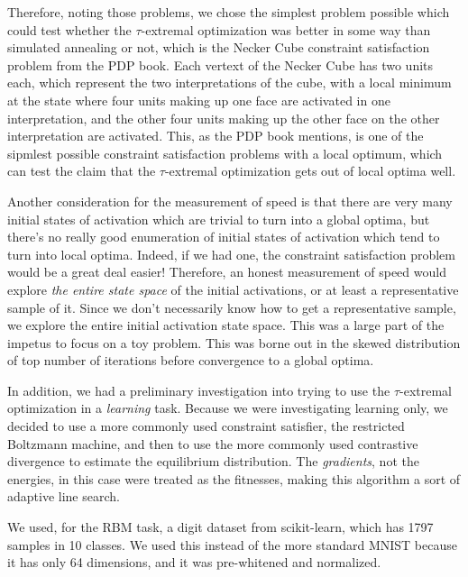 \documentclass[12pt]{article}
\begin{document}

Therefore, noting those problems, we chose the simplest problem possible which could test whether the $\tau$-extremal optimization was better in some way than simulated annealing or not, which is the Necker Cube constraint satisfaction problem from the PDP book. Each vertext of the Necker Cube has two units each, which represent the two interpretations of the cube, with a local minimum at the state where four units making up one face are activated in one interpretation, and the other four units making up the other face on the other interpretation are activated. This, as the PDP book mentions, is one of the sipmlest possible constraint satisfaction problems with a local optimum, which can test the claim that the $\tau$-extremal optimization gets out of local optima well.

Another consideration for the measurement of speed is that there are very many initial states of activation which are trivial to turn into a global optima, but there's no really good enumeration of initial states of activation which tend to turn into local optima. Indeed, if we had one, the constraint satisfaction problem would be a great deal easier! Therefore, an honest measurement of speed would explore \emph{the entire state space} of the initial activations, or at least a representative sample of it. Since we don't necessarily know how to get a representative sample, we explore the entire initial activation state space. This was a large part of the impetus to focus on a toy problem. This was borne out in the skewed distribution of top number of iterations before convergence to a global optima.

In addition, we had a preliminary investigation into trying to use the $\tau$-extremal optimization in a \emph{learning} task. Because we were investigating learning only, we decided to use a more commonly used constraint satisfier, the restricted Boltzmann machine, and then to use the more commonly used contrastive divergence to estimate the equilibrium distribution. The \emph{gradients}, not the energies, in this case were treated as the fitnesses, making this algorithm a sort of adaptive line search.

We used, for the RBM task, a digit dataset from scikit-learn, which has 1797 samples in 10 classes. We used this instead of the more standard MNIST because it has only 64 dimensions, and it was pre-whitened and normalized. %
\end{document}
